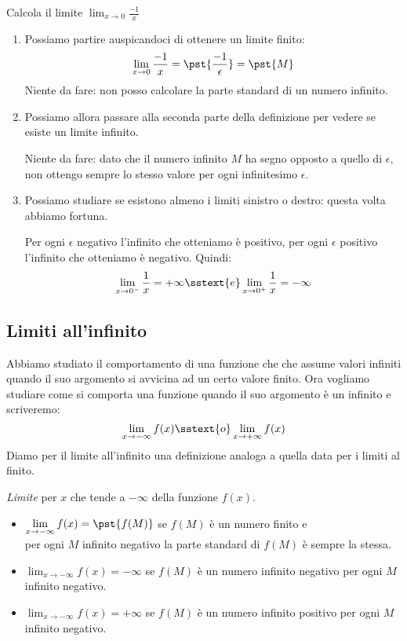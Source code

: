 \begin{esempio}
Calcola il limite \(\displaystyle \lim_{x \to 0}\frac{-1}{x}\)
\begin{enumerate} %
\item 
Possiamo partire auspicandoci di ottenere un limite finito:
\[\lim_{x \to 0}\frac{-1}{x} = \pst{\frac{-1}{\epsilon}} = \pst{M}\]
Niente da fare: non posso calcolare la parte standard di un numero infinito.
\item 
Possiamo allora passare alla seconda parte della definizione per vedere se 
esiste un limite infinito. 

Niente da fare: dato che il numero infinito \(M\) ha segno opposto a 
quello di \(\epsilon\), non ottengo sempre lo stesso valore per ogni 
infinitesimo \(\epsilon\).
\item 
Possiamo studiare se esistono almeno i limiti sinistro o destro: 
questa volta abbiamo fortuna. 

Per ogni \(\epsilon\) negativo l'infinito che 
otteniamo è positivo, per ogni \(\epsilon\) positivo l'infinito che 
otteniamo è negativo. Quindi:
\[\lim_{x \to 0^-}\frac{1}{x} = +\infty \sstext{e} 
\lim_{x \to 0^+}\frac{1}{x} = -\infty\]
\end{enumerate}
\end{esempio}


\subsection{Limiti all'infinito}
\label{subsec:cont_limiti_allinfinito}


Abbiamo studiato il comportamento di una funzione che 
che assume valori infiniti quando il suo argomento si avvicina ad un certo 
valore finito. 
Ora vogliamo studiare come si comporta una funzione quando il suo argomento 
è un infinito e scriveremo: 
\[\lim_{x \to -\infty} f(x) \sstext{o} \lim_{x \to +\infty} f(x)\]
Diamo per il limite all'infinito una definizione analoga a quella 
data per i limiti al finito.

\begin{definizione}
\emph{Limite} per \(x\) che tende a \(-\infty\) della funzione \(f(x)\).
\begin{itemize}
\item 
\(\displaystyle \lim_{x \to -\infty}f(x) = \pst{f(M)}\)
se \(f(M)\) è un numero finito e \\
per ogni \(M\) infinito negativo
la parte standard di \(f(M)\) è sempre la stessa.
\item 
\(\displaystyle \lim_{x \to -\infty}f(x) = -\infty\)
se \(f(M)\) è un numero infinito negativo 
per ogni \(M\) infinito negativo.
\item 
\(\displaystyle \lim_{x \to -\infty}f(x) = +\infty\)
se \(f(M)\) è un numero infinito positivo 
per ogni \(M\) infinito negativo.
\end{itemize}
\end{definizione}


